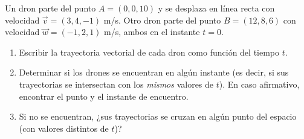 Un dron parte del punto $A = (0, 0, 10)$ y se desplaza en línea recta con velocidad $\vec{v} = (3, 4, -1)$ m/s. Otro dron parte del punto $B = (12, 8, 6)$ con velocidad $\vec{w} = (-1, 2, 1)$ m/s, ambos en el instante $t = 0$.
\begin{enumerate}
    \item Escribir la trayectoria vectorial de cada dron como función del tiempo $t$.
    \item Determinar si los drones se encuentran en algún instante (es decir, si sus trayectorias se intersectan con los \textit{mismos} valores de $t$). En caso afirmativo, encontrar el punto y el instante de encuentro.
    \item Si no se encuentran, ¿sus trayectorias se cruzan en algún punto del espacio (con valores distintos de $t$)?
\end{enumerate}